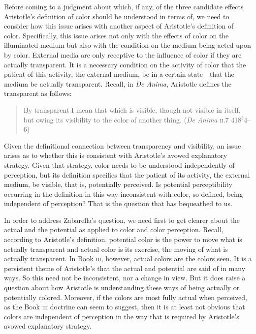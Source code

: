 Before coming to a judgment about which, if any, of the three candidate effects Aristotle's definition of color should be understood in terms of, we need to consider how this issue arises with another aspect of Aristotle's definition of color. Specifically, this issue arises not only with the effects of color on the illuminated medium but also with the condition on the medium being acted upon by color. External media are only receptive to the influence of color if they are actually transparent. It is a necessary condition on the activity of color that the patient of this activity, the external medium, be in a certain state---that the medium be actually transparent. Recall, in \emph{De Anima}, Aristotle defines the transparent as follows:
\begin{quote}
	By transparent I mean that which is visible, though not visible in itself, but owing its visibility to the color of another thing. (\emph{De Anima} \textsc{ii}.7 418\( ^{b} \)4--6)
\end{quote}
Given the definitional connection between transparency and visibility, an issue arises as to whether this is consistent with Aristotle's avowed explanatory strategy. Given that strategy, color needs to be understood independently of perception, but its definition specifies that the patient of its activity, the external medium, be visible, that is, potentially perceived. Is potential perceptibility occurring in the definition in this way inconsistent with color, so defined, being independent of perception? That is the question that \citet{Zabarella:1605kx} has bequeathed to us.

In order to address Zabarella's question, we need first to get clearer about the actual and the potential as applied to color and color perception. Recall, according to Aristotle's definition, potential color is the power to move what is actually transparent and actual color is its exercise, the moving of what is actually transparent. In Book \textsc{iii}, however, actual colors are the colors seen. It is a persistent theme of Aristotle's that the actual and potential are said of in many ways. So this need not be inconsistent, nor a change in view. But it does raise a question about how Aristotle is understanding these ways of being actually or potentially colored. Moreover, if the colors are most fully actual when perceived, as the Book \textsc{iii} doctrine can seem to suggest, then it is at least not obvious that colors are independent of perception in the way that is required by Aristotle's avowed explanatory strategy.

